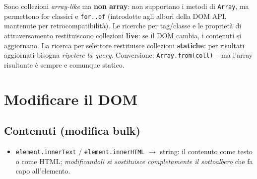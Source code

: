\begin{attenzione}
Sono collezioni \emph{array-like} ma \textbf{non array}: non supportano i metodi di
\texttt{Array}, ma permettono for classici e \texttt{for..of} (introdotte agli albori della
DOM API, mantenute per retrocompatibilit\`a). Le ricerche per tag/classe e le propriet\`a di
attraversamento restituiscono collezioni \textbf{live}: se il DOM cambia, i contenuti si
aggiornano. La ricerca per selettore restituisce collezioni \textbf{statiche}: per risultati
aggiornati bisogna \emph{ripetere la query}. Conversione:
\texttt{Array.from(coll)} -- ma l'array risultante \`e sempre e comunque statico.
\end{attenzione}

\section{Modificare il DOM}

\subsection{Contenuti (modifica bulk)}
\begin{itemize}
  \item \texttt{element.innerText} / \texttt{element.innerHTML} $\rightarrow$ string: il
        contenuto come testo o come HTML; \emph{modificandoli si sostituisce completamente il
        sottoalbero} che fa capo all'elemento.
\end{itemize}

